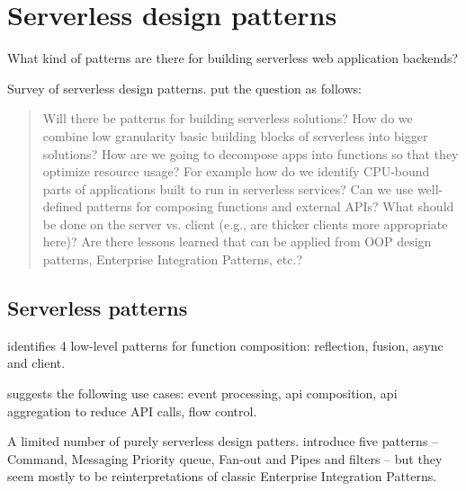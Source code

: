 \chapter{Serverless design patterns} \label{cha:patterns}

What kind of patterns are there for building serverless web application backends?

Survey of serverless design patterns. \textcite{baldini17currentTrends} put the question as follows:

\begin{quote}
Will there be patterns for building serverless solutions? How do we combine low granularity basic building blocks of serverless into bigger solutions? How are we going to decompose apps into functions so that they optimize resource usage? For example how do we identify CPU-bound parts of applications built to run in serverless services? Can we use well-defined patterns for composing functions and external APIs? What should be done on the server vs. client (e.g., are thicker clients more appropriate here)? Are there lessons learned that can be applied from OOP design patterns, Enterprise Integration Patterns, etc.?
\end{quote}

\section{Serverless patterns}


\textcite{baldini17trilemma} identifies 4 low-level patterns for function composition: reflection, fusion, async and client.

\textcite{baldini17currentTrends} suggests the following use cases: event processing, api composition, api aggregation to reduce API calls, flow control.

A limited number of purely serverless design patters. \textcite{sbarski2017serverless} introduce five patterns -- Command, Messaging Priority queue, Fan-out and Pipes and filters -- but they seem mostly to be reinterpretations of classic Enterprise Integration Patterns.

